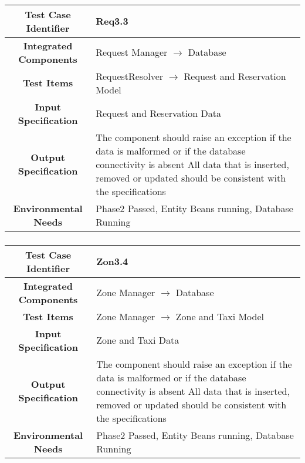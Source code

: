 \documentclass[11pt, a4paper,titlepage]{article}
\begin{document}
		\subsubsection{}
		\begin{tabularx}{\textwidth}{| c|X|}
			\hline \textbf{Test Case Identifier} & \label{Req3.3}Req3.3 \\
			\hline \textbf{Integrated Components} & Request Manager $\rightarrow $ Database \\
			\hline \textbf{Test Items} & RequestResolver $\rightarrow $ Request and Reservation Model \\
			\hline \textbf{Input Specification} & Request and Reservation Data \\
			\hline \textbf{Output Specification} & The component should raise an exception if the data is malformed or if the database connectivity is absent \newline
			All data that is inserted, removed or updated should be consistent with the specifications\\
			\hline \textbf{Environmental Needs} & Phase2 Passed, Entity Beans running, Database Running \\
			\hline
		\end{tabularx}
		\newline
		\subsubsection{}
		\begin{tabularx}{\textwidth}{| c|X|}
			\hline \textbf{Test Case Identifier} & \label{Zon3.4}Zon3.4 \\
			\hline \textbf{Integrated Components} & Zone Manager $\rightarrow $ Database \\
			\hline \textbf{Test Items} &  Zone Manager $\rightarrow $ Zone and Taxi Model \\
			\hline \textbf{Input Specification} & Zone and Taxi Data \\
			\hline \textbf{Output Specification} & The component should raise an exception if the data is malformed or if the database connectivity is absent \newline
			All data that is inserted, removed or updated should be consistent with the specifications\\
			\hline \textbf{Environmental Needs} & Phase2 Passed, Entity Beans running, Database Running \\
			\hline
		\end{tabularx}
		\newline
\end{document}
